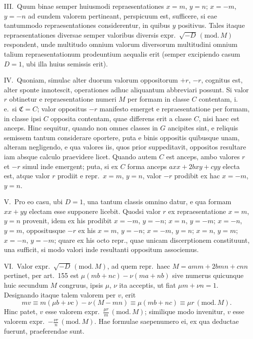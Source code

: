 \documentclass[12pt,a4paper]{article}
\theoremstyle{plain}
\theoremstyle{definition}
\theoremstyle{remark}
\begin{document}
\textsc{III.}\ Quum binae semper huiusmodi repraesentationes $x=m$, $y=n$; $x=-m$, $y=-n$ ad eundem valorem pertineant, perspicuum est, sufficere, si eae tantummodo repraesentationes considerentur, in quibus $y$ positivus. Tales itaque repraesentationes diversae semper valoribus diversis expr.~$\surd{-D}\,(\mathrm{mod.}\,M)$ respondent, unde multitudo omnium valorum diversorum multitudini omnium talium repraesentationum prodeuntium aequalis erit (semper excipiendo casum $D=1$, ubi illa huius semissis erit).

\textsc{IV.}\ Quoniam, simulac alter duorum valorum oppositorum $+r$, $-r$, cognitus est, alter sponte innotescit, operationes adhuc aliquantum abbreviari possunt. Si valor $r$ obtinetur e repraesentatione numeri $M$ per formam in classe $C$ contentam, i.\,e.\ si $\mathfrak{C}=C$; valor oppositus $-r$ manifesto emerget e repraesentatione per formam, in classe ipsi $C$ opposita contentam, quae differens erit a classe $C$, nisi haec est anceps. Hinc sequitur, quando non omnes classes in $G$ ancipites sint, e reliquis semissem tantum considerare oportere, puta e binis oppositis quibusque unam, alteram negligendo, e qua valores iis, quos prior suppeditavit, oppositos resultare iam absque calculo praevidere licet. Quando autem $C$ est anceps, ambo valores $r$ et $-r$ simul inde emergent; puta, si ex $C$ forma anceps $axx+2bxy+cyy$ electa est, atque valor $r$ prodiit e repr.\ $x=m$, $y=n$, valor $-r$ prodibit ex hac $x=-m$, $y=n$.

\textsc{V.}\ Pro eo casu, ubi $D=1$, una tantum classis omnino datur, e qua formam $xx+yy$ electam esse supponere licebit. Quodsi valor $r$ ex repraesentatione $x=m$, $y=n$ provenit, idem ex his prodibit $x=-m$, $y=-n$; $x=n$, $y=-m$; $x=-n$, $y=m$, oppositusque $-r$ ex his $x=m$, $y=-n$; $x=-m$, $y=n$; $x=n$, $y=m$; $x=-n$, $y=-m$; quare ex his octo repr., quae unicam discerptionem constituunt, una sufficit, si modo valori inde resultanti oppositum associemus.

\textsc{VI.}\ Valor expr.~$\surd{-D}\,(\mathrm{mod.}\,M)$, ad quem repr.\ haec $M=amm+2bmn+cnn$ pertinet, per art.\ 155 est $\mu(mb+nc)-\nu(ma+nb)$ sive numerus quicunque huic secundum $M$ congruus, ipsis $\mu$, $\nu$ ita acceptis, ut fiat $\mu m+\nu n=1$. Designando itaque talem valorem per $v$, erit
\[mv\equiv m(\mu b+\nu c)-\nu(M-mn)\equiv\mu(mb+nc)\equiv\mu r\,(\mathrm{mod.}\,M).\]
Hinc patet, $v$ esse valorem expr.~$\frac{\mu r}{m}\,(\mathrm{mod.}\,M)$; similique modo invenitur, $v$ esse valorem expr.~$-\frac{\nu r}{n}\,(\mathrm{mod.}\,M)$. Hae formulae saepenumero ei, ex qua deductae fuerunt, praeferendae sunt.
\end{document}
